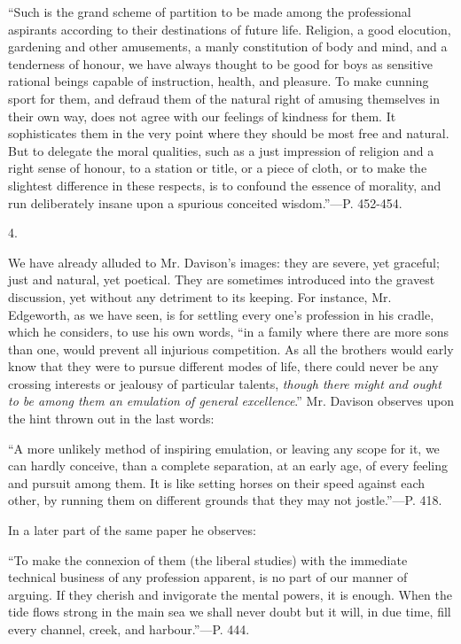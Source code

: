 ``Such
is the grand scheme of partition to be made among the professional
aspirants according to their destinations of future life. Religion, a good elocution, gardening
and other amusements, a manly constitution of body and mind, and a
tenderness of honour, we have always thought to be good for boys as
sensitive rational beings capable of instruction, health, and
pleasure. To make cunning sport for them, and defraud them of the
natural right of amusing themselves in their own way, does not agree
with our feelings of kindness for them. It sophisticates them in the
very point where they should be most free and natural. But to delegate
the moral qualities, such as a just impression of religion and a right
sense of honour, to a station or title, or a piece of cloth, or to
make the slightest difference in these respects, is to confound the
essence of morality, and run deliberately insane upon a spurious
conceited wisdom.''—P. 452-454.

4.

We have already alluded to Mr. Davison's images:
they are severe, yet graceful; just and natural, yet poetical. They
are sometimes introduced into the gravest discussion, yet without any
detriment to its keeping. For instance, Mr. Edgeworth, as we have
seen, is for settling every one's profession in his cradle, which he
considers, to use his own words, ``in a family where there are more
sons than one, would prevent all injurious competition. As all the
brothers would early know that they were to pursue different modes of
life, there could never be any crossing interests or jealousy of
particular talents, \emph{though there might and ought to be among them
an emulation of general excellence}.'' Mr. Davison observes upon the
hint thrown out in the last words:

``A
more unlikely method of inspiring emulation, or leaving any scope for
it, we can hardly conceive, than a complete separation, at an early
age, of every feeling and pursuit among them. It is like setting
horses on their speed against each other, by running them on different
grounds that they may not jostle.''—P. 418.

In a later part of the same paper he observes:

``To
make the connexion of them (the liberal studies) with the immediate
technical business of any profession apparent, is no part of our
manner of arguing. If they cherish and invigorate the mental powers,
it is enough. When the tide flows strong in the main sea we shall
never doubt but it will, in due time, fill every channel, creek, and
harbour.''—P. 444.

